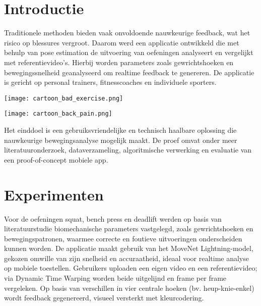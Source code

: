 \documentclass[a0,portrait]{hogent-poster}
\begin{document}
\begin{multicols}{2} %

\section{Introductie}
\noindent
\begin{minipage}[t]{0.48\linewidth}

  Traditionele methoden bieden vaak onvoldoende nauwkeurige feedback, wat het risico op blessures vergroot. 
Daarom werd een applicatie ontwikkeld die met behulp van pose estimation de uitvoering van oefeningen analyseert en vergelijkt met referentievideo’s. 
Hierbij worden parameters zoals gewrichtshoeken en bewegingssnelheid geanalyseerd om realtime feedback te genereren. 
De applicatie is gericht op personal trainers, fitnesscoaches en individuele sporters. 

\end{minipage}
\hfill
\begin{minipage}[t]{0.48\linewidth}
\texttt{[image: cartoon\_bad\_exercise.png]}
\end{minipage}
\vspace{1em}


\noindent
\begin{minipage}[t]{0.48\linewidth}
\texttt{[image: cartoon\_back\_pain.png]}
\end{minipage}
\hfill
\begin{minipage}[t]{0.48\linewidth}

Het einddoel is een gebruiksvriendelijke en technisch haalbare oplossing die nauwkeurige bewegingsanalyse mogelijk maakt. 
De proef omvat onder meer literatuuronderzoek, dataverzameling, algoritmische verwerking en evaluatie van een proof-of-concept mobiele app.
\end{minipage}
\vspace{1em}

\section{Experimenten}

\noindent
\begin{minipage}[t]{0.48\linewidth}

 Voor de oefeningen squat, bench press en deadlift werden op basis van literatuurstudie biomechanische parameters vastgelegd, zoals gewrichtshoeken en bewegingspatronen, waarmee correcte en foutieve uitvoeringen onderscheiden kunnen worden. 
 De applicatie maakt gebruik van het MoveNet Lightning-model, gekozen omwille van zijn snelheid en accuraatheid, ideaal voor realtime analyse op mobiele toestellen. 
 Gebruikers uploaden een eigen video en een referentievideo; via Dynamic Time Warping worden beide uitgelijnd en frame per frame vergeleken. 
 Op basis van verschillen in vier centrale hoeken (bv. heup-knie-enkel) wordt feedback gegenereerd, visueel versterkt met kleurcodering. 


\end{minipage}
\end{multicols}
\end{document}
